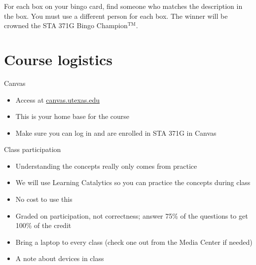 \documentclass{beamer}\usepackage[]{graphicx}\usepackage[]{color}
\begin{document}
\begin{darkframes}
    \begin{frame}{}
      \begin{center}
        For each box on your bingo card, find someone who matches the description in the box. You must use a different person for each box.
        \vfill
        The winner will be crowned the STA 371G Bingo Champion$^{\text{TM}}$.
      \end{center}
    \end{frame}

    \section{Course logistics}

    \begin{frame}{Canvas}
      \begin{itemize}
        \item Access at \url{canvas.utexas.edu}
        \item This is your home base for the course
        \item Make sure you can log in and are enrolled in STA 371G in Canvas
      \end{itemize}
    \end{frame}

    \begin{frame}{Class participation}
      \begin{itemize}
        \item Understanding the concepts really only comes from practice
        \item We will use \alert{Learning Catalytics} so you can practice the concepts during class
        \item No cost to use this
        \item Graded on participation, not correctness; answer 75\% of the questions to get 100\% of the credit
        \item Bring a laptop to every class (check one out from the Media Center if needed)
        \item A note about devices in class
      \end{itemize}
    \end{frame}



\end{darkframes}
\end{document}
